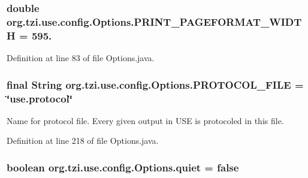 \hypertarget{classorg_1_1tzi_1_1use_1_1config_1_1_options_a75899fd6b68a84ea0bc197408a3841af}{
\subsubsection[{P\-R\-I\-N\-T\-\_\-\-P\-A\-G\-E\-F\-O\-R\-M\-A\-T\-\_\-\-W\-I\-D\-T\-H}]{\setlength{\rightskip}{0pt plus 5cm}double org.\-tzi.\-use.\-config.\-Options.\-P\-R\-I\-N\-T\-\_\-\-P\-A\-G\-E\-F\-O\-R\-M\-A\-T\-\_\-\-W\-I\-D\-T\-H = 595.\hspace{0.3cm}{\ttfamily [static]}}}\label{classorg_1_1tzi_1_1use_1_1config_1_1_options_a75899fd6b68a84ea0bc197408a3841af}


Definition at line 83 of file Options.\-java.

\hypertarget{classorg_1_1tzi_1_1use_1_1config_1_1_options_ab02683385a521818d243c5938fa4d090}{
\subsubsection[{P\-R\-O\-T\-O\-C\-O\-L\-\_\-\-F\-I\-L\-E}]{\setlength{\rightskip}{0pt plus 5cm}final String org.\-tzi.\-use.\-config.\-Options.\-P\-R\-O\-T\-O\-C\-O\-L\-\_\-\-F\-I\-L\-E = \char`\"{}use.\-protocol\char`\"{}\hspace{0.3cm}{\ttfamily [static]}}}\label{classorg_1_1tzi_1_1use_1_1config_1_1_options_ab02683385a521818d243c5938fa4d090}
Name for protocol file. Every given output in U\-S\-E is protocoled in this file. 

Definition at line 218 of file Options.\-java.

\hypertarget{classorg_1_1tzi_1_1use_1_1config_1_1_options_afa90cb8040fdaaa95daad1104497f707}{
\subsubsection[{quiet}]{\setlength{\rightskip}{0pt plus 5cm}boolean org.\-tzi.\-use.\-config.\-Options.\-quiet = false\hspace{0.3cm}{\ttfamily [static]}}}\label{classorg_1_1tzi_1_1use_1_1config_1_1_options_afa90cb8040fdaaa95daad1104497f707}


